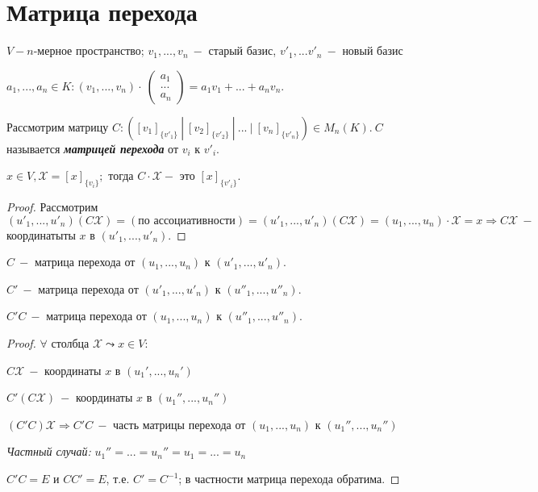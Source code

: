 \section{Матрица перехода}

\begin{definition}
    $V-n$-мерное пространство; $v_1,...,v_n\ -$ старый базис, 
$v'_1,...v'_n\ -$ новый базис

    $a_1,...,a_n\in K:(v_1,...,v_n)\cdot\ \begin{pmatrix} a_1\\...\\a_n 
\end{pmatrix}=a_1v_1+...+a_nv_n$.

    Рассмотрим матрицу $C:([v_1]_{\{v'_1\}}\ |\ [v_2]_{\{v'_2\}}\ |\ ...\ 
|\ [v_n]_{\{v'_n\}})\in M_{n}(K).\ C$ называется \textbf{\textit{матрицей 
перехода}} от $v_i$ к $v'_i.$ 
\end{definition}

\begin{statement}
    $x\in V,\mathcal{X}=[x]_{\{v_i\}};$ тогда $C\cdot\mathcal{X}-$ это 
$[x]_{\{v'_i\}}.$
\end{statement}

\begin{proof}
    Рассмотрим $(u'_1,...,u'_n)(C\mathcal{X})=(\text{по 
ассоциативности})=(u'_1,...,u'_n)(C\mathcal{X})=(u_1,...,u_n)\cdot 
\mathcal{X}=x\Rightarrow C\mathcal{X}\ -$ координатыты $x$ в 
$(u'_1,...,u'_n)$.
\end{proof}

\begin{corollary}
    $C\ -$ матрица перехода от $(u_1,...,u_n)$ к $(u'_1,...,u'_n)$.

    $C'\ -$ матрица перехода от $(u'_1,...,u'_n)$ к $(u''_1,...,u''_n)$.

    $C'C\ -$ матрица перехода от $(u_1,...,u_n)$ к $(u''_1,...,u''_n)$.
\end{corollary}


\begin{proof}
    $\forall$ столбца $\mathcal{X}\leadsto x\in V:$ 

    $C\mathcal{X}\ -$  координаты $x$ в $(u_1',...,u_n')$

    $C'(C\mathcal{X})\ -$  координаты $x$ в $(u_1'',...,u_n'')$

    $(C'C)\mathcal{X}\Rightarrow C'C\ -$ часть матрицы перехода от 
$(u_1,...,u_n)$ к $(u_1'',...,u_n'')$

    \textit{Частный случай:} $u_1''=...=u_n''=u_1=...=u_n$

    $C'C=E$ и $CC'=E$, т.е. $C'=C^{-1}$; в частности матрица перехода 
обратима.    
\end{proof}
